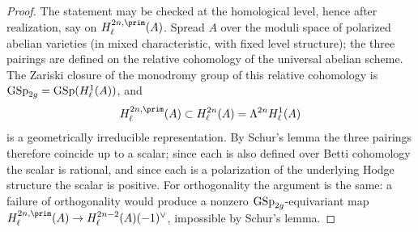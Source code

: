 \begin{proof}
  The statement may be checked at the homological level, hence after
  realization, say on \(H_\ell^{2n,\prim}(A)\). Spread \(A\) over the moduli
  space of polarized abelian varieties (in mixed characteristic, with fixed
  level structure); the three pairings are defined on the relative cohomology of
  the universal abelian scheme. The Zariski closure of the monodromy group of
  this relative cohomology is \(\mathrm{GSp}_{2g} = \mathrm{GSp}(H_\ell^{1}(A))\), and
  \[H_\ell^{2n,\prim}(A) \subset H_\ell^{2n}(A) = \Lambda^{2n} H_\ell^{1}(A)\]
  is a geometrically irreducible representation. By Schur's lemma the three
  pairings therefore coincide up to a scalar; since each is also defined over
  Betti cohomology the scalar is rational, and since each is a polarization of
  the underlying Hodge structure the scalar is positive. For orthogonality the
  argument is the same: a failure of orthogonality would produce a nonzero
  \(\mathrm{GSp}_{2g}\)-equivariant map
  \(H_\ell^{2n,\prim}(A) \to H_\ell^{2n-2}(A)(-1)^\vee\), impossible by Schur's
  lemma.
\end{proof}

